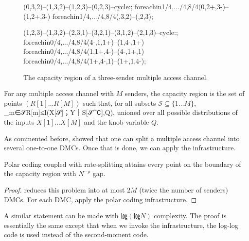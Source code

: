 \documentclass[openany]{amsbook}
\numberwithin{equation}{chapter}
\numberwithin{figure}{chapter}
\numberwithin{table}{chapter}
\def\[#1\]{\begin{equation*}{#1}\end{equation*}}
\theoremstyle{definition}	理dfn:Definition~?s			理exa:Example~?s
\theoremstyle{remark}		理cla:Claim~?s				理rem:Remark~?s
\begin{document}
\begin{figure}
{\begin{scope}
				\face	(0,3,2)--(1,3,2)--(1,2,3)--(0,2,3)--cycle:;
				\mesh	foreach\x in{1/4,.../4,8/4}{(0,2+\x,3-\x)--(1,2+\x,3-\x)}
						foreach\x in{1/4,.../4,8/4}{(\x,3,2)--(\x,2,3)};
			\end{scope}
			\begin{scope}
				\face	(1,2,3)--(1,3,2)--(2,3,1)--(3,2,1)--(3,1,2)--(2,1,3)--cycle:;
				\mesh	foreach\z in{0/4,.../4,8/4}{(4-\z,1,1+\z)--(1,4-\z,1+\z)}
						foreach\y in{0/4,.../4,8/4}{(1,1+\y,4-\y)--(4-\y,1+\y,1)}
						foreach\x in{0/4,.../4,8/4}{(1+\x,4-\x,1)--(1+\x,1,4-\x)};
			\end{scope}
		}
		\caption{
			The capacity region of a three-sender multiple access channel.
		}\label{fig:polymatroid}
	\end{figure}
	
	\begin{thm}
		For any multiple access channel with $M$ senders, the capacity region is
		the set of points $(R[1]…R[M])$ such that, for all subsets $𝒮⊆\{1…M\}$,
		\[∑_{m∈𝒮}R[m]≤I(X[𝒮]；Y｜S[𝒮^∁],Q),\]
		unioned over all possible distributions
		of the inputs $X[1]…X[M]$ and the knob variable $Q$.
	\end{thm}
	
	As commented before, \cite{GRUW01} showed that one can
	split a multiple access channel into several one-to-one DMCs.
	Once that is done, we can apply the infrastructure.
	
	\begin{cor}
		Polar coding coupled with rate-splitting attains every point
		on the boundary of the capacity region with $N^{-ρ}$ gap.
	\end{cor}
	
	\begin{proof}
		\cite{GRUW01} reduces this problem into at most $2M$
		(twice the number of senders) DMCs.
		For each DMC, apply the polar coding infrastructure.
	\end{proof}
	
	A similar statement can be made with $㏒(㏒N)$ complexity.
	The proof is essentially the same except that when we invoke the infrastructure,
	the log-log code is used instead of the second-moment code.



\g@addto@macro{}


\end{document}
